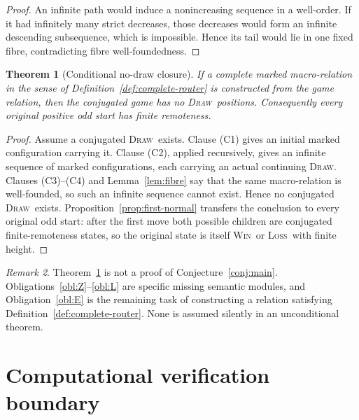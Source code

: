 \documentclass[11pt,a4paper]{article}
\newtheorem{theorem}{Theorem}[section]
\theoremstyle{definition}
\theoremstyle{remark}
\newtheorem{remark}[theorem]{Remark}
\newcommand{\WIN}{\textnormal{\textsc{Win}}}
\newcommand{\LOSS}{\textnormal{\textsc{Loss}}}
\newcommand{\DRAW}{\textnormal{\textsc{Draw}}}
\begin{document}
\begin{proof}
An infinite path would induce a nonincreasing sequence in a well-order.  If
it had infinitely many strict decreases, those decreases would form an
infinite descending subsequence, which is impossible.  Hence its tail would
lie in one fixed fibre, contradicting fibre well-foundedness.
\end{proof}

\begin{theorem}[Conditional no-draw closure]\label{thm:conditional}
If a complete marked macro-relation in the sense of
Definition~\ref{def:complete-router} is constructed from the game relation,
then the conjugated game has no \DRAW\ positions.  Consequently every
original positive odd start has finite remoteness.
\end{theorem}

\begin{proof}
Assume a conjugated \DRAW\ exists.  Clause (C1) gives an initial marked
configuration carrying it.  Clause (C2), applied recursively, gives an
infinite sequence of marked configurations, each carrying an actual
continuing \DRAW.  Clauses (C3)--(C4) and
Lemma~\ref{lem:fibre} say that the same macro-relation is well-founded, so
such an infinite sequence cannot exist.  Hence no conjugated \DRAW\ exists.
Proposition~\ref{prop:first-normal} transfers the conclusion to every
original odd start: after the first move both possible children are
conjugated finite-remoteness states, so the original state is itself
\WIN\ or \LOSS\ with finite height.
\end{proof}

\begin{remark}
Theorem~\ref{thm:conditional} is not a proof of
Conjecture~\ref{conj:main}.  Obligations~\ref{obl:Z}--\ref{obl:L} are
specific missing semantic modules, and Obligation~\ref{obl:E} is the
remaining task of constructing a relation satisfying
Definition~\ref{def:complete-router}.  None is assumed silently in an
unconditional theorem.
\end{remark}

\section{Computational verification boundary}
\end{document}
